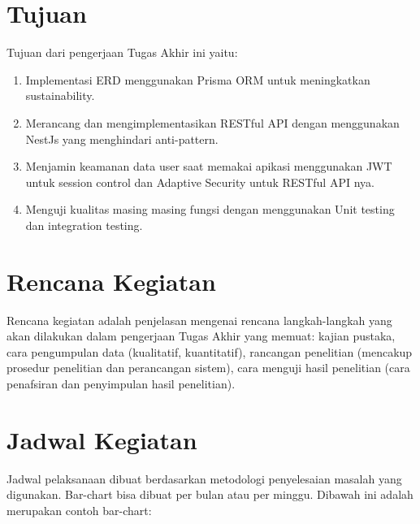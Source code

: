 \section{Tujuan}
Tujuan dari pengerjaan Tugas Akhir ini yaitu:
\begin{enumerate}
  \item Implementasi ERD menggunakan Prisma ORM untuk meningkatkan sustainability.
  \item Merancang dan mengimplementasikan RESTful API dengan menggunakan NestJs yang menghindari anti-pattern.
  \item Menjamin keamanan data user saat memakai apikasi menggunakan JWT untuk session control dan Adaptive Security untuk RESTful API nya.
  \item Menguji kualitas masing masing fungsi dengan menggunakan Unit testing dan integration testing.
\end{enumerate}

\section{Rencana Kegiatan}
Rencana kegiatan adalah penjelasan mengenai rencana langkah-langkah yang akan dilakukan dalam pengerjaan Tugas Akhir yang memuat: kajian pustaka, cara pengumpulan data (kualitatif, kuantitatif), rancangan penelitian (mencakup prosedur penelitian dan perancangan sistem), cara menguji hasil penelitian (cara penafsiran dan penyimpulan hasil penelitian).

\section{Jadwal Kegiatan}

Jadwal pelaksanaan dibuat berdasarkan metodologi penyelesaian masalah yang digunakan. Bar-chart bisa dibuat per bulan atau per minggu. Dibawah ini adalah merupakan contoh bar-chart:


